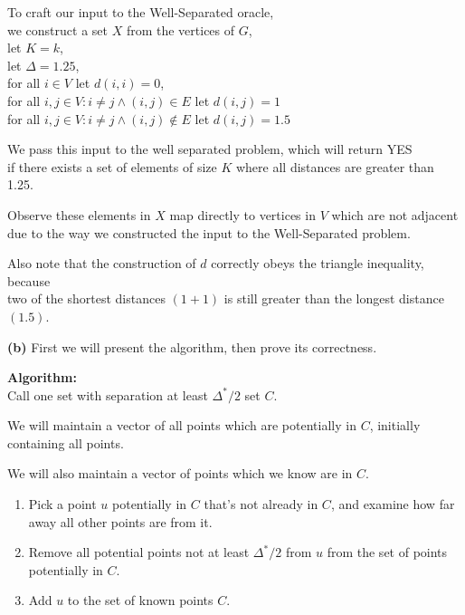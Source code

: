 \documentclass[11pt]{article}
\renewcommand{\part}[1] {\vspace{.10in} {\bf (#1)}}
\begin{document}
To craft our input to the Well-Separated oracle,\\
we construct a set $X$ from the vertices of $G$,\\
let $K = k$,\\
let $\Delta = 1.25$,\\
for all $i \in V$ let $d(i,i) = 0$,\\
for all $i,j \in V : i \neq j \wedge (i,j) \in E$ let $d(i,j) = 1$\\
for all $i,j \in V : i \neq j \wedge (i,j) \notin E$ let $d(i,j) = 1.5$

We pass this input to the well separated problem, which will return YES\\
if there exists a set of elements of size $K$ where all distances are greater than 1.25.

Observe these elements in $X$ map directly to vertices in $V$ which are not adjacent\\
due to the way we constructed the input to the Well-Separated problem.

Also note that the construction of $d$ correctly obeys the triangle inequality, because\\
two of the shortest distances $(1 + 1)$ is still greater than the longest distance $(1.5)$.


\part{b}
First we will present the algorithm, then prove its correctness.

\textbf{Algorithm:}\\
Call one set with separation at least $\Delta^{*} / 2$ set $C$.

We will maintain a vector of all points which are potentially in $C$, initially containing all points.

We will also maintain a vector of points which we know are in $C$.

\begin{enumerate}
\item Pick a point $u$ potentially in $C$ that's not already in $C$, and examine how far away all other points are from it.
\item Remove all potential points not at least $\Delta^{*} / 2$ from $u$ from the set of points potentially in $C$.
\item Add $u$ to the set of known points $C$.
\end{enumerate}
\end{document}
